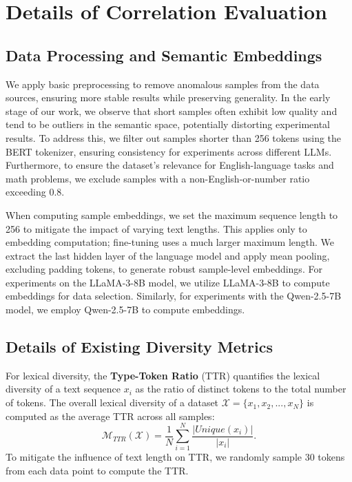 \section{Details of Correlation Evaluation}

\subsection{Data Processing and Semantic Embeddings}
\label{app:preprocess}
We apply basic preprocessing to remove anomalous samples from the data sources, ensuring more stable results while preserving generality. In the early stage of our work, we observe that short samples often exhibit low quality and tend to be outliers in the semantic space, potentially distorting experimental results. To address this, we filter out samples shorter than 256 tokens using the BERT \cite{devlin2018bert} tokenizer, ensuring consistency for experiments across different LLMs. Furthermore, to ensure the dataset's relevance for English-language tasks and math problems, we exclude samples with a non-English-or-number ratio exceeding 0.8. 

When computing sample embeddings, we set the maximum sequence length to 256 to mitigate the impact of varying text lengths. This applies only to embedding computation; fine-tuning uses a much larger maximum length. We extract the last hidden layer of the language model and apply mean pooling, excluding padding tokens, to generate robust sample-level embeddings. For experiments on the LLaMA-3-8B model, we utilize LLaMA-3-8B to compute embeddings for data selection. Similarly, for experiments with the Qwen-2.5-7B model, we employ Qwen-2.5-7B to compute embeddings.

\subsection{Details of Existing Diversity Metrics}
\label{app:exist}
For lexical diversity, the \textbf{Type-Token Ratio} (TTR) quantifies the lexical diversity of a text sequence $x_i$ as the ratio of distinct tokens to the total number of tokens. The overall lexical diversity of a dataset $\mathcal{X} = \{x_1, x_2, ..., x_N\}$ is computed as the average TTR across all samples:  
\begin{equation}  
    \mathcal{M}_{TTR}(\mathcal{X}) = \frac{1}{N} \sum_{i=1}^{N} \frac{|Unique(x_i)|}{|x_i|}.  
\end{equation}  
To mitigate the influence of text length on TTR, we randomly sample 30 tokens from each data point to compute the TTR.  

